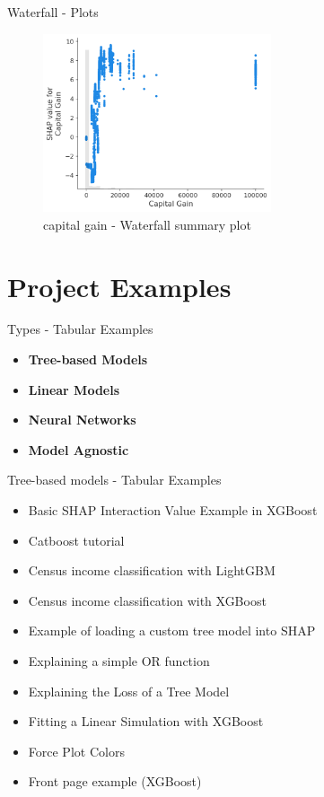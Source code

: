 \documentclass[aspectratio=169]{beamer}
\begin{document}
\begin{frame}{Waterfall - Plots}
    \begin{figure}[htbp]
        \centering
        \includegraphics[width=0.6\textwidth]{figs/shap/plots/waterfall/example_notebooks_api_examples_plots_waterfall_7_0.png}
        \caption{capital gain - Waterfall summary plot}
        \label{fig:cap-waterfall-plot}
    \end{figure}
\end{frame}



\section{Project Examples}

\begin{frame}{Types - Tabular Examples}
    \begin{itemize}
        \item \textbf{Tree-based Models}
        \item \textbf{Linear Models}
        \item \textbf{Neural Networks}
        \item \textbf{Model Agnostic}
    \end{itemize}   
\end{frame}

\begin{frame}{Tree-based models - Tabular Examples}
    \begin{itemize}
        \item Basic \ac{SHAP} Interaction Value Example in XGBoost
        \item Catboost tutorial
        \item Census income classification with LightGBM
        \item Census income classification with XGBoost
        \item Example of loading a custom tree model into \ac{SHAP}
        \item Explaining a simple OR function
        \item Explaining the Loss of a Tree Model
        \item Fitting a Linear Simulation with XGBoost
        \item Force Plot Colors
        \item Front page example (XGBoost)
    \end{itemize}
\end{frame}
\end{document}
